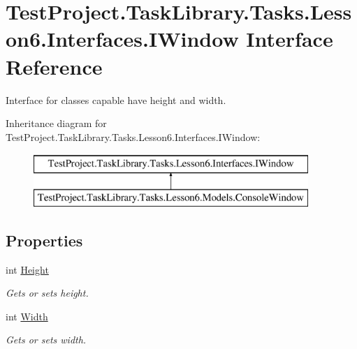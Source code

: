 \hypertarget{interface_test_project_1_1_task_library_1_1_tasks_1_1_lesson6_1_1_interfaces_1_1_i_window}{}\section{Test\+Project.\+Task\+Library.\+Tasks.\+Lesson6.\+Interfaces.\+I\+Window Interface Reference}
\label{interface_test_project_1_1_task_library_1_1_tasks_1_1_lesson6_1_1_interfaces_1_1_i_window}


Interface for classes capable have height and width.  


Inheritance diagram for Test\+Project.\+Task\+Library.\+Tasks.\+Lesson6.\+Interfaces.\+I\+Window\+:\begin{figure}[H]
\begin{center}
\leavevmode
\includegraphics[height=2.000000cm]{interface_test_project_1_1_task_library_1_1_tasks_1_1_lesson6_1_1_interfaces_1_1_i_window}
\end{center}
\end{figure}
\subsection*{Properties}
\begin{DoxyCompactItemize}
\item 
int \mbox{\hyperlink{interface_test_project_1_1_task_library_1_1_tasks_1_1_lesson6_1_1_interfaces_1_1_i_window_ac72040558a4e392443ce380bc46abf38}{Height}}
\begin{DoxyCompactList}\small\item\em Gets or sets height. \end{DoxyCompactList}\item 
int \mbox{\hyperlink{interface_test_project_1_1_task_library_1_1_tasks_1_1_lesson6_1_1_interfaces_1_1_i_window_a5a97d89b0ffceaf6fc2e9b4ee0fe705b}{Width}}
\begin{DoxyCompactList}\small\item\em Gets or sets width. \end{DoxyCompactList}\end{DoxyCompactItemize}


